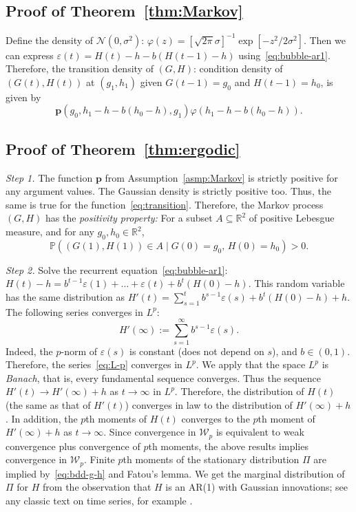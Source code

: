 \documentclass[12pt]{amsart}
\theoremstyle{definition}
\begin{document}
\subsection{Proof of Theorem~\ref{thm:Markov}} Define the density of $\mathcal N(0, \sigma^2)$: $\varphi(z) = [\sqrt{2\pi}\sigma]^{-1}\exp\left[-z^2/2\sigma^2\right]$. Then we can express $\varepsilon(t) = H(t) - h - b(H(t-1) - h)$ using~\eqref{eq:bubble-ar1}. Therefore, the transition density of $(G, H)$: condition density of $(G(t), H(t))$ at $(g_1, h_1)$ given $G(t-1) = g_0$ and $H(t-1) = h_0$, is given by
\begin{equation}
\label{eq:transition}
\mathbf{p}(g_0, h_1 - h - b(h_0 - h), g_1)\varphi(h_1 - h - b(h_0 - h)).
\end{equation}

\subsection{Proof of Theorem~\ref{thm:ergodic}} {\it Step 1.} The function $\mathbf{p}$ from Assumption~\ref{asmp:Markov} is strictly positive for any argument values. The Gaussian density is strictly positive too. Thus, the same is true for the function~\eqref{eq:transition}. Therefore, the Markov process $(G, H)$ has the {\it positivity property:} For a subset $A \subseteq \mathbb R^2$ of positive Lebesgue measure, and for any $g_0, h_0 \in \mathbb R^2$, 
\begin{equation}
\label{eq:pve}
\mathbb P((G(1), H(1)) \in A\mid G(0) = g_0,\, H(0) = h_0) > 0.
\end{equation}

{\it Step 2.} Solve the recurrent equation~\eqref{eq:bubble-ar1}: $H(t) - h = b^{t-1}\varepsilon(1) + \ldots + \varepsilon(t) + b^t(H(0) - h)$. This random variable has the same distribution as $H'(t) = \sum_{s=1}^tb^{s-1}\varepsilon(s) + b^t(H(0) - h) + h$. The following series converges in $L^p$:
\begin{equation}
\label{eq:L-p}
H'(\infty) := \sum\limits_{s=1}^{\infty}b^{s-1}\varepsilon(s).
\end{equation}
Indeed, the $p$-norm of $\varepsilon(s)$ is constant (does not depend on $s$), and $b \in (0, 1)$. Therefore, the series~\eqref{eq:L-p} converges in $L^p$. We apply that the space $L^p$ is {\it Banach}, that is, every fundamental sequence converges.
Thus the sequence $H'(t) \to H'(\infty) + h$ as $t \to \infty$ in $L^p$. Therefore, the distribution of $H(t)$ (the same as that of $H'(t)$) converges in law to the distribution of $H'(\infty) + h$. In addition, the $p$th moments of $H(t)$ converges to the $p$th moment of $H'(\infty) + h$ as $t \to \infty$. Since convergence in $\mathcal W_p$ is equivalent to weak convergence plus convergence of $p$th moments, the above results implies convergence in $\mathcal W_p$. Finite $p$th moments of the stationary distribution $\Pi$ are implied by~\eqref{eq:bdd-g-h} and Fatou's lemma. We get the marginal distribution of $\Pi$ for $H$ from the observation that $H$ is an AR(1) with Gaussian innovations; see any classic text on time series, for example \cite{BrockwellDavis}. 
\end{document}
